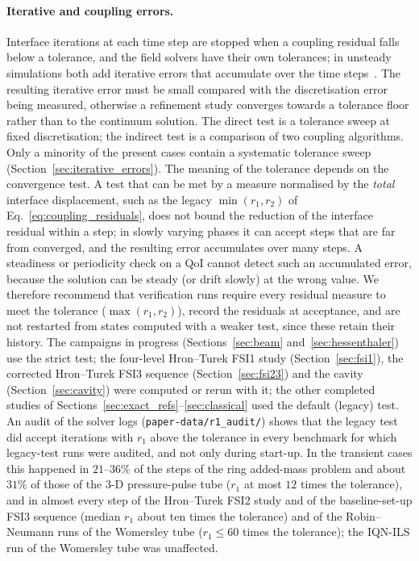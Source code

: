 \paragraph{Iterative and coupling errors.}
Interface iterations at each time step are stopped when a coupling residual falls below a tolerance, and the field solvers have their own tolerances; in unsteady simulations both add iterative errors that accumulate over the time steps~\citep{Eca2019}.
The resulting iterative error must be small compared with the discretisation error being measured, otherwise a refinement study converges towards a tolerance floor rather than to the continuum solution.
The direct test is a tolerance sweep at fixed discretisation; the indirect test is a comparison of two coupling algorithms.
Only a minority of the present cases contain a systematic tolerance sweep (Section~\ref{sec:iterative_errors}).
The meaning of the tolerance depends on the convergence test.
A test that can be met by a measure normalised by the \emph{total} interface displacement, such as the legacy $\min(r_1, r_2)$ of Eq.~\eqref{eq:coupling_residuals}, does not bound the reduction of the interface residual within a step; in slowly varying phases it can accept steps that are far from converged, and the resulting error accumulates over many steps.
A steadiness or periodicity check on a QoI cannot detect such an accumulated error, because the solution can be steady (or drift slowly) at the wrong value.
We therefore recommend that verification runs require every residual measure to meet the tolerance ($\max(r_1, r_2)$), record the residuals at acceptance, and are not restarted from states computed with a weaker test, since these retain their history.
The campaigns in progress (Sections~\ref{sec:beam} and~\ref{sec:hessenthaler}) use the strict test; the four-level Hron--Turek FSI1 study (Section~\ref{sec:fsi1}), the corrected Hron--Turek FSI3 sequence (Section~\ref{sec:fsi23}) and the cavity (Section~\ref{sec:cavity}) were computed or rerun with it; the other completed studies of Sections~\ref{sec:exact_refs}--\ref{sec:classical} used the default (legacy) test.
An audit of the solver logs (\texttt{paper-data/r1\_audit/}) shows that the legacy test did accept iterations with $r_1$ above the tolerance in every benchmark for which legacy-test runs were audited, and not only during start-up.
In the transient cases this happened in $21$--$36\%$ of the steps of the ring added-mass problem and about $31\%$ of those of the 3-D pressure-pulse tube ($r_1$ at most $12$ times the tolerance), and in almost every step of the Hron--Turek FSI2 study and of the baseline-set-up FSI3 sequence (median $r_1$ about ten times the tolerance) and of the Robin--Neumann runs of the Womersley tube ($r_1\leq60$ times the tolerance); the IQN-ILS run of the Womersley tube was unaffected.
